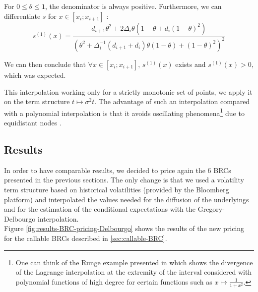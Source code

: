 \documentclass[a4paper,11pt,english]{book}
\begin{document}
For $0 \leq \theta \leq 1$, the denominator is always positive. Furthermore, we can differentiate $s$ for $x\in[x_i;x_{i+1}]$ :
$$s^{(1)}(x) = \frac{d_{i+1}\theta^2+2\Delta_i\theta(1-\theta+d_i(1-\theta)^2)}{(\theta^2+\Delta_i^{-1}(d_{i+1}+d_i)\theta(1-\theta)+(1-\theta)^2)^2}$$

We can then conclude that $\forall x\in[x_i;x_{i+1}]$, $s^{(1)}(x)$ exists and $s^{(1)}(x)>0$, which was expected.

This interpolation working only for a strictly monotonic set of points, we apply it on the term structure $t \mapsto \sigma^2 t$. The advantage of such an interpolation compared with a polynomial interpolation is that it avoids oscillating phenomena\footnote{One can think of the Runge example presented in \cite{quarteroni2000methodes} which shows the divergence of the Lagrange interpolation at the extremity of the interval considered with polynomial functions of high degree for certain functions such as $x \mapsto \frac{1}{1+x^2}$.} due to equidistant nodes \cite{quarteroni2000methodes}.

\subsection{Results}
In order to have comparable results, we decided to price again the 6 BRCs presented in the previous sections. The only change is that we used a volatility term structure based on historical volatilities (provided by the Bloomberg platform) and interpolated the values needed for the diffusion of the underlyings and for the estimation of the conditional expectations with the Gregory-Delbourgo interpolation.\\

Figure \ref{fig:results-BRC-pricing-Delbourgo} shows the results of the new pricing for the callable BRCs described in \ref{sec:callable-BRC}. 
\end{document}
